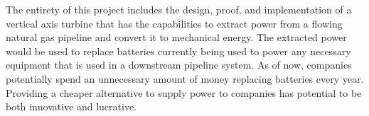 \documentclass[12pt]{article}
\begin{document}
\hspace{0.5 in}The entirety of this project includes the design, proof, and implementation of a vertical axis turbine that has the capabilities to extract power from a flowing natural gas pipeline and convert it to mechanical energy. The extracted power would be used to replace batteries currently being used to power any necessary equipment that is used in a downstream pipeline system. As of now, companies potentially spend an unnecessary amount of money replacing batteries every year. Providing a cheaper alternative to supply power to companies has potential to be both innovative and lucrative.
\end{document}
